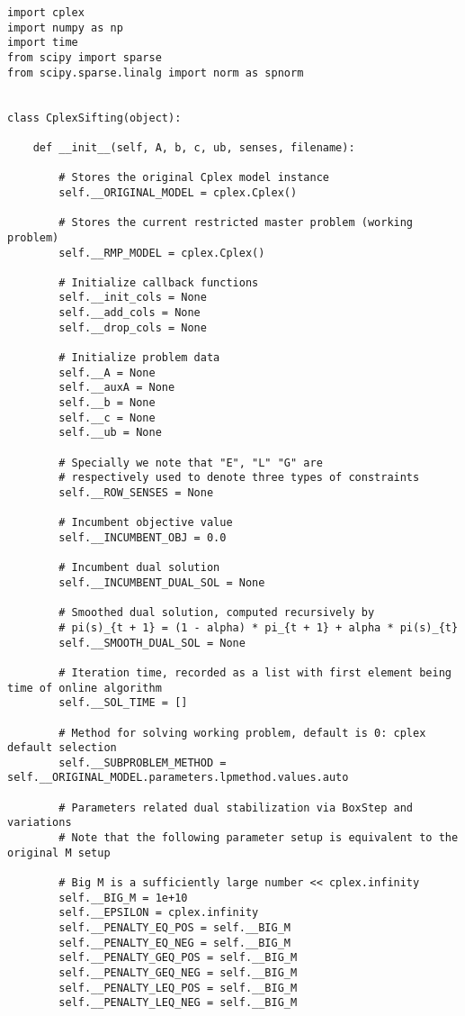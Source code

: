 \documentclass{article}
\begin{document}
\begin{lstlisting}
import cplex
import numpy as np
import time
from scipy import sparse
from scipy.sparse.linalg import norm as spnorm


class CplexSifting(object):

    def __init__(self, A, b, c, ub, senses, filename):

        # Stores the original Cplex model instance
        self.__ORIGINAL_MODEL = cplex.Cplex()

        # Stores the current restricted master problem (working problem)
        self.__RMP_MODEL = cplex.Cplex()

        # Initialize callback functions
        self.__init_cols = None
        self.__add_cols = None
        self.__drop_cols = None

        # Initialize problem data
        self.__A = None
        self.__auxA = None
        self.__b = None
        self.__c = None
        self.__ub = None

        # Specially we note that "E", "L" "G" are 
        # respectively used to denote three types of constraints
        self.__ROW_SENSES = None

        # Incumbent objective value
        self.__INCUMBENT_OBJ = 0.0

        # Incumbent dual solution
        self.__INCUMBENT_DUAL_SOL = None

        # Smoothed dual solution, computed recursively by 
        # pi(s)_{t + 1} = (1 - alpha) * pi_{t + 1} + alpha * pi(s)_{t}
        self.__SMOOTH_DUAL_SOL = None

        # Iteration time, recorded as a list with first element being time of online algorithm
        self.__SOL_TIME = []

        # Method for solving working problem, default is 0: cplex default selection
        self.__SUBPROBLEM_METHOD = self.__ORIGINAL_MODEL.parameters.lpmethod.values.auto

        # Parameters related dual stabilization via BoxStep and variations
        # Note that the following parameter setup is equivalent to the original M setup

        # Big M is a sufficiently large number << cplex.infinity
        self.__BIG_M = 1e+10
        self.__EPSILON = cplex.infinity
        self.__PENALTY_EQ_POS = self.__BIG_M
        self.__PENALTY_EQ_NEG = self.__BIG_M
        self.__PENALTY_GEQ_POS = self.__BIG_M
        self.__PENALTY_GEQ_NEG = self.__BIG_M
        self.__PENALTY_LEQ_POS = self.__BIG_M
        self.__PENALTY_LEQ_NEG = self.__BIG_M


\end{lstlisting}
\end{document}
